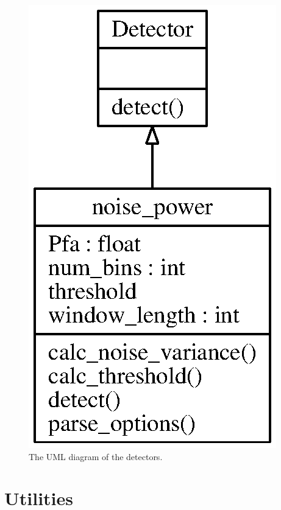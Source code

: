 \documentclass[a4paper, openany, oneside]{memoir}
\begin{document}
\begin{figure}
    \centering
    \includegraphics{./figures/classes_detection.eps}
    \caption{The UML diagram of the detectors.}
    \label{fig:umldetector}
\end{figure}

\section{Utilities}
\label{sec:utilities}
\end{document}
